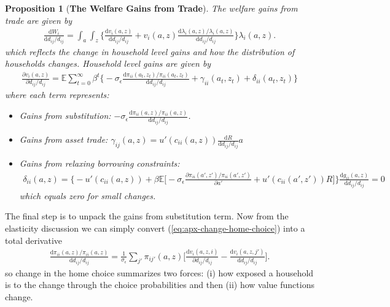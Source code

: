 \documentclass[12pt,pdftex]{article}
\newtheorem{prp}{Proposition}
\begin{document}
\begin{onehalfspacing}
\begin{prp}[\textbf{The Welfare Gains from Trade}] \label{apx-prp:gains-trade} The welfare gains from trade are given by
{\footnotesize
\begin{align}
\frac{\mathrm{d} W_{i}}{\mathrm{d} d_{ij} / d_{ij}} = \int_{a}\int_{z}  \bigg \{ \frac{\mathrm{d} v_i(a, z)}{\mathrm{d} d_{ij} / d_{ij}}  + v_{i}(a,z) \frac{\mathrm{d} \lambda_{i}(a,z)/ \lambda_{i}(a,z)}{\mathrm{d} d_{ij} / d_{ij}}  \bigg \} \lambda_{i}(a,z).
\nonumber
\end{align}
}which reflects the change in household level gains and how the distribution of households changes. Household level gains are given by
{\footnotesize
\begin{align}
\nonumber
\frac{\partial v_i(a, z)}{\partial d_{ij} / d_{ij}} = \mathbb{E} \sum_{t = 0}^{\infty} \beta^{t} \bigg \{ -\sigma_{\epsilon} \frac{\mathrm{d} \pi_{ii}(a_{t},z_{t}) / \pi_{ii}(a_{t},z_{t})}{\mathrm{d}d_{ij} / d_{ij}} + \gamma_{ii}(a_{t},z_{t}) + \delta_{ii}(a_{t},z_{t}) \bigg \}
\end{align}
}where each term represents:
\begin{itemize}
\item Gains from substitution: $-\sigma_{\epsilon} \frac{\mathrm{d} \pi_{ii}(a,z) / \pi_{ii}(a,z)}{\mathrm{d}d_{ij} / d_{ij}}$.

\item Gains from asset trade: $\gamma_{ij}(a,z) = u'(c_{ii}(a,z))\frac{\mathrm{d} R}{\mathrm{d} d_{ij} / d_{ij}}a$

\item Gains from relaxing borrowing constraints:
\begin{align}
\nonumber
\delta_{ii}(a,z) = \bigg \{- u'(c_{ii}(a,z)) + \beta \mathbb{E} \big [-\sigma_{\epsilon} \frac{\partial \pi_{ii}(a',z') / \pi_{ii}(a',z')}{\partial a'} + u'(c_{ii}(a',z'))R \big ] \bigg \}\frac{\mathrm{d} g_{ii}(a,z)}{\mathrm{d} d_{ij} / d_{ij}} = 0
\end{align}
which equals zero for small changes.
\end{itemize}
\end{prp}
The final step is to unpack the gains from substitution term. Now from the elasticity discussion we can simply convert (\ref{eq:apx-change-home-choice}) into a total derivative
\begin{align}
\frac{\mathrm{d} \pi_{ii}(a,z) / \pi_{ii}(a,z) }{\mathrm{d} d_{ij} / d_{ij}} = \frac{1}{\sigma_{\epsilon}} \sum_{j'} \pi_{ij'}(a,z) \bigg[ \frac{\mathrm{d} v_{i}(a,z,i)}{\partial d_{ij}/d_{ij}} - \frac{\mathrm{d} v_{i}(a,z,j')}{\mathrm{d} d_{ij}/d_{ij}} \bigg].
\end{align}
so change in the home choice summarizes two forces: (i) how exposed a household is to the change through the choice probabilities and then (ii) how value functions change.


\end{onehalfspacing}
\end{document}
